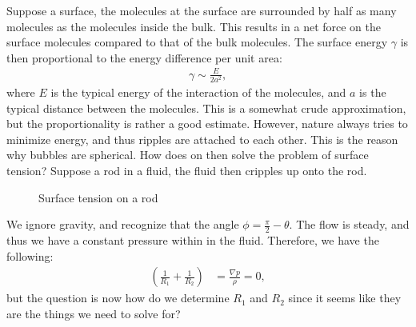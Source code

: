 \documentclass[a4paper]{article}
\begin{document}
\vspace*{0.5cm}\noindent
Suppose a surface, the molecules at the surface are surrounded by half as many molecules as the molecules inside the bulk. This results in a net force on the surface molecules compared to that of the bulk molecules.
The surface energy $\gamma$ is then proportional to the energy difference per unit area:
\begin{align*}
    \gamma\sim \frac{E}{2a^2},
\end{align*}where $E$ is the typical energy of the interaction of the molecules, and $a$ is the typical distance between the molecules.
This is a somewhat crude approximation, but the proportionality is rather a good estimate. However, nature always tries to minimize energy, and thus ripples are attached to each other. This is the reason why bubbles are spherical.
How does on then solve the problem of surface tension? Suppose a rod in a fluid, the fluid then cripples up onto the rod.
\begin{figure}[H]
    \centering
    \caption{Surface tension on a rod}
    \label{fig: Surface tension on a rod}
\end{figure}\noindent
We ignore gravity, and recognize that the angle $\phi = \frac{\pi}{2} -\theta$. The flow is steady, and thus we have a constant pressure within in the fluid.
Therefore, we have the following:
\begin{align*}
    \left(\frac{1}{R_1} + \frac{1}{R_2}\right) &= \frac{\nabla p}{\rho} = 0,
\end{align*}but the question is now how do we determine $R_1$ and $R_2$ since it seems like they are the things we need to solve for?
\end{document}
